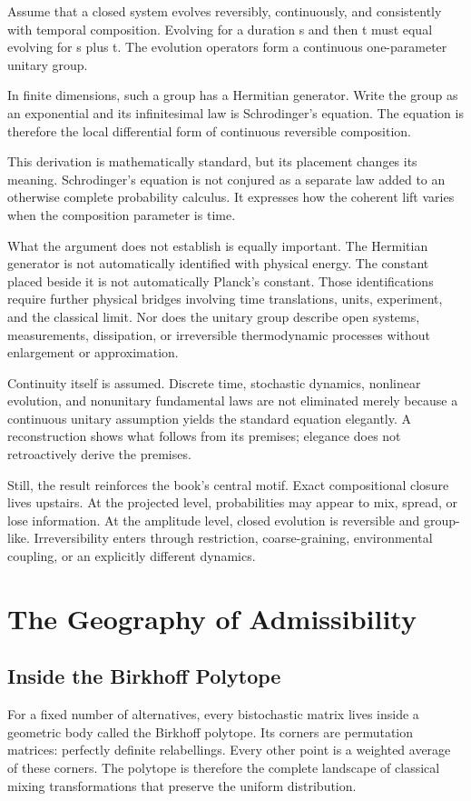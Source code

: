 \documentclass[12pt,openany]{book}
\begin{document}
Assume that a closed system evolves reversibly, continuously, and consistently with temporal composition. Evolving for a duration s and then t must equal evolving for s plus t. The evolution operators form a continuous one-parameter unitary group.

In finite dimensions, such a group has a Hermitian generator. Write the group as an exponential and its infinitesimal law is Schrodinger's equation. The equation is therefore the local differential form of continuous reversible composition.

This derivation is mathematically standard, but its placement changes its meaning. Schrodinger's equation is not conjured as a separate law added to an otherwise complete probability calculus. It expresses how the coherent lift varies when the composition parameter is time.

What the argument does not establish is equally important. The Hermitian generator is not automatically identified with physical energy. The constant placed beside it is not automatically Planck's constant. Those identifications require further physical bridges involving time translations, units, experiment, and the classical limit. Nor does the unitary group describe open systems, measurements, dissipation, or irreversible thermodynamic processes without enlargement or approximation.

Continuity itself is assumed. Discrete time, stochastic dynamics, nonlinear evolution, and nonunitary fundamental laws are not eliminated merely because a continuous unitary assumption yields the standard equation elegantly. A reconstruction shows what follows from its premises; elegance does not retroactively derive the premises.

Still, the result reinforces the book's central motif. Exact compositional closure lives upstairs. At the projected level, probabilities may appear to mix, spread, or lose information. At the amplitude level, closed evolution is reversible and group-like. Irreversibility enters through restriction, coarse-graining, environmental coupling, or an explicitly different dynamics.

\part{The Geography of Admissibility}

\chapter{Inside the Birkhoff Polytope}
For a fixed number of alternatives, every bistochastic matrix lives inside a geometric body called the Birkhoff polytope. Its corners are permutation matrices: perfectly definite relabellings. Every other point is a weighted average of these corners. The polytope is therefore the complete landscape of classical mixing transformations that preserve the uniform distribution.
\end{document}
